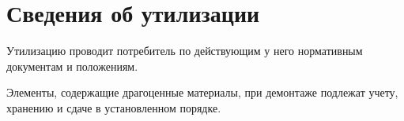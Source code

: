 \newpage

\section{Сведения об утилизации}
	Утилизацию {\genitivecasename} проводит потребитель 
	по действующим у него нормативным документам 
	и положениям.

	Элементы, содержащие драгоценные материалы, 
	при демонтаже {\genitivecasename} подлежат учету, 
	хранению и сдаче в установленном порядке.